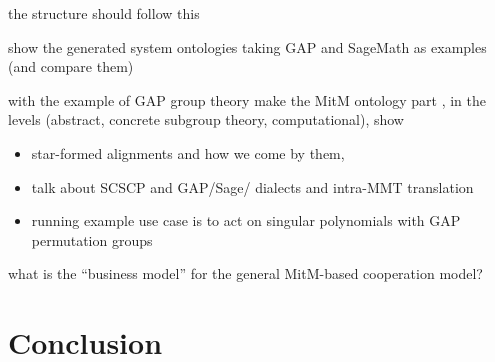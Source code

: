 \documentclass{llncs}
\begin{document}
\begin{todolist}{the structure should follow this}
\item show the generated system ontologies taking GAP and SageMath as examples (and
  compare them)
\item with the example of GAP group theory make the MitM ontology part , in the levels
  (abstract, concrete subgroup theory, computational), show 
  \begin{itemize}
  \item star-formed alignments and how we come by them, 
  \item talk about SCSCP and GAP/Sage/ dialects and intra-MMT translation
  \item running example use case is to act on singular polynomials with GAP permutation
    groups
  \end{itemize}
\item what is the ``business model'' for the general MitM-based cooperation model? 
\end{todolist}

\section{Conclusion}\label{sec:concl}
\printbibliography
\end{document}
